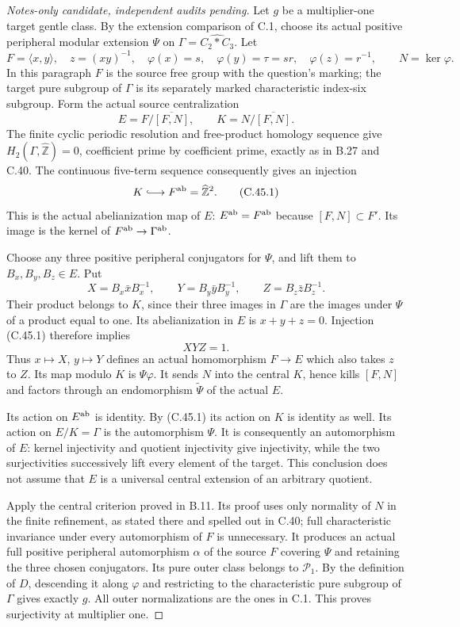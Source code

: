 \begin{proof}[Notes-only candidate, independent audits pending]
Let $g$ be a multiplier-one target gentle class. By the extension
comparison of C.1, choose its actual positive peripheral modular
extension $\Psi$ on
$\Gamma=\widehat{C_2*C_3}$. Let
\[
 F=\langle x,y\rangle,\quad z=(xy)^{-1},\quad
 \varphi(x)=s,\quad\varphi(y)=\tau=sr,\quad
 \varphi(z)=r^{-1},\qquad N=\ker\varphi.
\]
In this paragraph $F$ is the source free group with the question's
marking; the target pure subgroup of $\Gamma$ is its separately
marked characteristic index-six subgroup. Form the actual source
centralization
\[
 E=F/\overline{[F,N]},\qquad
 K=N/\overline{[F,N]}.
\]
The finite cyclic periodic resolution and free-product homology
sequence give $H_2(\Gamma,\widehat{\mathbb Z})=0$, coefficient
prime by coefficient prime, exactly as in B.27 and C.40.
The continuous five-term sequence consequently gives an injection
\[
                  K\lhook\joinrel\longrightarrow
                       F^{\rm ab}=\widehat{\mathbb Z}^{2}.
                                                               \tag{C.45.1}
\]
This is the actual abelianization map of $E$:
$E^{\rm ab}=F^{\rm ab}$ because $[F,N]\subset F'$. Its image
is the kernel of $F^{\rm ab}\to\Gamma^{\rm ab}$.

Choose any three positive peripheral conjugators for $\Psi$,
and lift them to $B_x,B_y,B_z\in E$. Put
\[
 X=B_x\bar x B_x^{-1},\qquad
 Y=B_y\bar y B_y^{-1},\qquad
 Z=B_z\bar z B_z^{-1}.
\]
Their product belongs to $K$, since their three images in
$\Gamma$ are the images under $\Psi$ of a product equal to one.
Its abelianization in $E$ is $x+y+z=0$. Injection (C.45.1)
therefore implies
\[
                               XYZ=1.                 \tag{C.45.2}
\]
Thus $x\mapsto X$, $y\mapsto Y$ defines an actual homomorphism
$F\to E$ which also takes $z$ to $Z$. Its map modulo $K$ is
$\Psi\varphi$. It sends $N$ into the central $K$, hence kills
$[F,N]$ and factors through an endomorphism $\widetilde\Psi$ of
the actual $E$.

Its action on $E^{\rm ab}$ is identity. By (C.45.1) its action
on $K$ is identity as well. Its action on $E/K=\Gamma$ is the
automorphism $\Psi$. It is consequently an automorphism of $E$:
kernel injectivity and quotient injectivity give injectivity,
while the two surjectivities successively lift every element of
the target. This conclusion does not assume that $E$ is a universal
central extension of an arbitrary quotient.

Apply the central criterion proved in B.11. Its proof uses only
normality of $N$ in the finite refinement, as stated there and
spelled out in C.40; full characteristic invariance under every
automorphism of $F$ is unnecessary. It produces an actual full
positive peripheral automorphism $\alpha$ of the source $F$
covering $\Psi$ and retaining the three chosen conjugators.
Its pure outer class belongs to $\mathcal P_1$. By the definition
of $D$, descending it along $\varphi$ and restricting to the
characteristic pure subgroup of $\Gamma$ gives exactly $g$.
All outer normalizations are the ones in C.1. This proves
surjectivity at multiplier one.


\end{proof}
